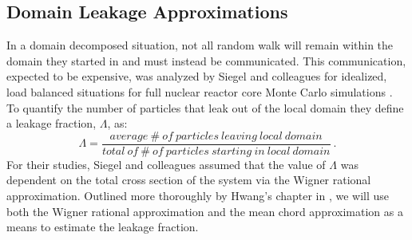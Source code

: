 \documentclass[preprint,11pt]{elsarticle}
\begin{document}
\subsection{Domain Leakage Approximations}
\label{subsec:domain_leak_approx}

In a domain decomposed situation, not all random walk will remain within the
domain they started in and must instead be communicated. This communication,
expected to be expensive, was analyzed by Siegel and colleagues for idealized,
load balanced situations for full nuclear reactor core Monte Carlo simulations
\cite{siegel_analysis_2012}.  To quantify the number of particles that leak
out of the local domain they define a leakage fraction, $\Lambda$, as:
\begin{equation}
  \Lambda = \frac{average\ \#\ of\ particles\ leaving\ local\ domain}
          {total\ of\ \#\ of\ particles\ starting\ in\ local\ domain}\:.
          \label{eq:leakage_fraction}
\end{equation}
For their studies, Siegel and colleagues assumed that the value of
$\Lambda$ was dependent on the total cross section of the system via
the Wigner rational approximation. Outlined more thoroughly by Hwang's
chapter in \cite{azmy_nuclear_2010}, we will use both the Wigner
rational approximation and the mean chord approximation as a means to
estimate the leakage fraction.
\end{document}
